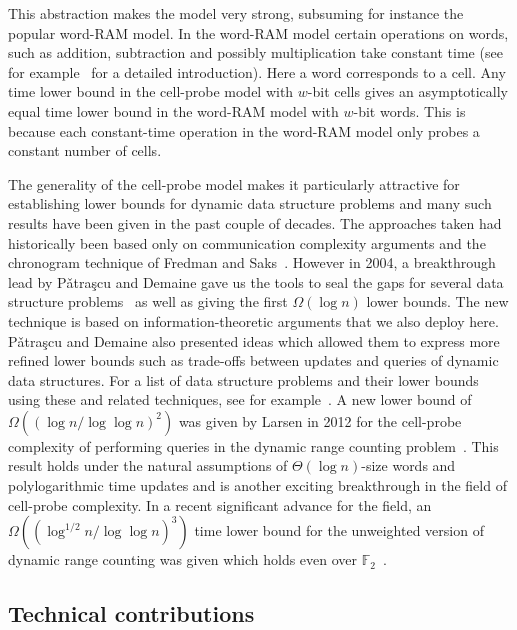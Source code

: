 \documentclass{toc}
\newcommand{\Patrascu}{P{\v a}tra{\c s}cu\xspace}
\begin{document}
This abstraction makes the model very strong, subsuming for instance the popular word-RAM model. In the word-RAM model certain operations on words, such as addition, subtraction and possibly multiplication take constant time (see for example~\cite{Hagerup:1998} for a detailed introduction). Here a word corresponds to a cell. Any time lower bound in the cell-probe model with
%
$w$-bit    %
cells gives an asymptotically equal time lower bound in the word-RAM model with
%
$w$-bit    %
words. This is because each 
%
constant-time    %
operation in the word-RAM model only probes a constant number of cells.

The generality of the cell-probe model makes it particularly attractive for establishing lower bounds for dynamic data structure problems and many such results have been given in the past couple of decades. The approaches taken had historically been based only on communication complexity arguments and the chronogram technique of Fredman and Saks~\cite{FS1989:chronogram}.
%
However in 2004, a breakthrough lead by \Patrascu and Demaine gave us the tools to seal the gaps for several data structure problems~\cite{PD2006:Low-Bounds} as well as giving the first $\Omega(\log{n})$ lower bounds. The new technique is based on
%
information-theoretic   %
arguments that we also deploy here. \Patrascu and Demaine also presented ideas which allowed them to express more refined lower bounds such as trade-offs between updates and queries of dynamic data structures.  For a list of data structure problems and their lower bounds using these and related techniques, see for example~\cite{Pat2008:Thesis}.  A new lower bound of $\Omega\left((\log{n}/\log{\log{n}})^2\right)$ was given by Larsen in 2012 for the cell-probe complexity of performing queries in the dynamic range counting problem~\cite{Larsen:2012}.
This result  holds under the natural assumptions of
%
$\Theta(\log{n})$-size   %
words and polylogarithmic time updates and is another exciting breakthrough in the field of cell-probe complexity.  In a recent significant advance for the field, an $\Omega((\log^{1/2} n/\log{\log{n}})^3)$ time lower bound for the unweighted version of dynamic range counting was given which holds even over $\mathbb{F}_2$~\cite{larsen:2017:crossing}.




%
\subsection{Technical contributions}
\end{document}
